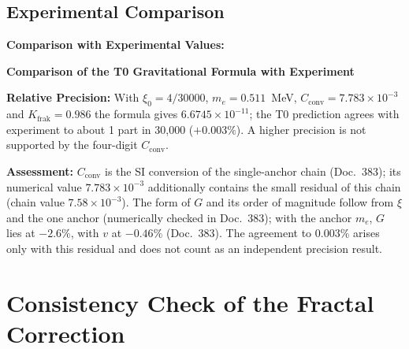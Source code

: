 	\subsection{Experimental Comparison}
	
	\begin{verification}
		\textbf{Comparison with Experimental Values:}
		
		\begin{center}
		\end{center}
		
		\textbf{Comparison of the T0 Gravitational Formula with Experiment}
		
		\textbf{Relative Precision:} With $\xi_0 = 4/30000$, $m_e = 0.511$~MeV, $C_{\text{conv}} = 7.783\times10^{-3}$ and $K_{\text{frak}} = 0.986$ the formula gives $6.6745\times10^{-11}$; the T0 prediction agrees with experiment to about 1 part in 30,000 ($+0.003\%$). A higher precision is not supported by the four-digit $C_{\text{conv}}$.

		\textbf{Assessment:} $C_{\text{conv}}$ is the SI conversion of the single-anchor chain (Doc.~383); its numerical value $7.783\times10^{-3}$ additionally contains the small residual of this chain (chain value $7.58\times10^{-3}$). The form of $G$ and its order of magnitude follow from $\xi$ and the one anchor (numerically checked in Doc.~383); with the anchor $m_e$, $G$ lies at $-2.6\%$, with $v$ at $-0.46\%$ (Doc.~383). The agreement to $0.003\%$ arises only with this residual and does not count as an independent precision result.
	\end{verification}
	
	\section{Consistency Check of the Fractal Correction}
	
